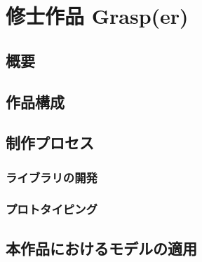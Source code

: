 \chapter{修士作品 Grasp(er)}
\section{概要}
\section{作品構成}
\section{制作プロセス}
\subsection{ライブラリの開発}
\subsection{プロトタイピング}
\section{本作品におけるモデルの適用}